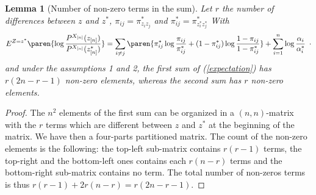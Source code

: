 \documentclass[11pt]{article}
\newtheorem{proof}{Proof}%
\newtheorem{lem}[thm]{Lemma}
\newcommand{\Xn}{X_{[n]}}
\newcommand{\zn}{z_{[n]}}
\newcommand{\PXn}{P^{\Xn}}
\begin{document}
\begin{lem}[Number of non-zero terms in the sum] \label{lemmeN} Let $r$ the number of differences between $z$ and $z^*$, $\pi_{ij}=\pi^*_{z_iz_j}$ and
$\pi^*_{ij}=\pi^*_{z^*_iz^*_j}$ With
\begin{align}\label{expectation}
E^{Z=z^*} \paren{ \log \frac{\PXn(\zn)}{\PXn(\zn^*)} } = \sum_{i \neq j} \paren{ \pi_{ij}^*
\log \frac{\pi_{ij}}{\pi_{ij}^*} + (1-\pi_{ij}^*) \log
\frac{1-\pi_{ij}}{1-\pi_{ij}^*}} + \sum_{i=1}^n \log
\frac{\alpha_i}{\alpha_i^*} \enspace \cdot
\end{align}
and under the assumptions 1 and 2, the first sum of
(\ref{expectation}) has $r(2n-r-1)$ non-zero elements, whereas the second sum has $r$ non-zero elements.
\end{lem}


\begin{proof}
The $n^2$ elements of the first sum can be organized in a $(n,n)$-matrix with the $r$ terms which are different between $z$ and $z^*$ at the beginning of the matrix. We have then a four-parts partitioned matrix. The count of the non-zero elements is the following: the top-left sub-matrix contains $r(r-1)$ terms, the top-right and the bottom-left ones contains each $r(n-r)$ terms and the bottom-right sub-matrix contains no term. The total number of non-zeros terms is thus $r(r-1)+2r(n-r)=r(2n-r-1)$.



\end{proof}
\end{document}
